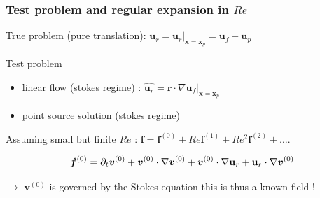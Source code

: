 \documentclass{sintefbeamer}
\begin{document}
\begin{frame}
  \frametitle{Test problem and regular expansion in $Re$}

  True problem (pure translation): $\textbf{u}_r  = \textbf{u}_r|_{\bm x = \bm x_p} = \textbf{u}_f-\textbf{u}_p$
  \vspace{0.5cm}

  Test problem 
  \begin{itemize}
    \item linear flow (stokes regime) : $\hat{\textbf{u}_r} =  \textbf{r} \cdot \nabla \hat{\textbf{u}}_f |_{\bm x = \bm x_p}$
    \item point source solution (stokes regime)
  \end{itemize}
  \vspace{0.5cm}

  Assuming small but finite $Re$ : $\bm f = \bm f^{(0)} + Re  \bm f^{(1)} + Re^2  \bm f^{(2)} + \ldots$. 

  
  \begin{equation*}
    \bm f^{(0)}
    =
        \partial_t \bm v^{(0)}
        + \bm v^{(0)}\cdot \mathbf{\nabla}\bm v^{(0)} 
        +  \bm v^{(0)}\cdot \mathbf{\nabla}\textbf{u}_r 
        +  \textbf{u}_r\cdot \mathbf{\nabla}\bm v^{(0)}
  \end{equation*}

  $\to$ $\bm v^{(0)}$ is governed by the Stokes equation this is thus a known field ! 
\end{frame}
\end{document}
